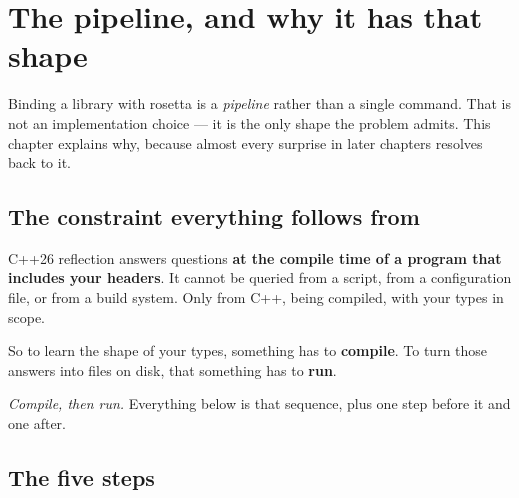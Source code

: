 \chapter{The pipeline, and why it has that shape}
\label{ch:pipeline}

Binding a library with rosetta is a \emph{pipeline} rather than a single
command. That is not an implementation choice --- it is the only shape the
problem admits. This chapter explains why, because almost every surprise in
later chapters resolves back to it.

\section{The constraint everything follows from}

C++26 reflection answers questions \textbf{at the compile time of a program
that includes your headers}. It cannot be queried from a script, from a
configuration file, or from a build system. Only from C++, being compiled, with
your types in scope.

So to learn the shape of your types, something has to \textbf{compile}. To turn
those answers into files on disk, that something has to \textbf{run}.

\begin{center}
\emph{Compile, then run.} Everything below is that sequence, plus one step
before it and one after.
\end{center}

\section{The five steps}

